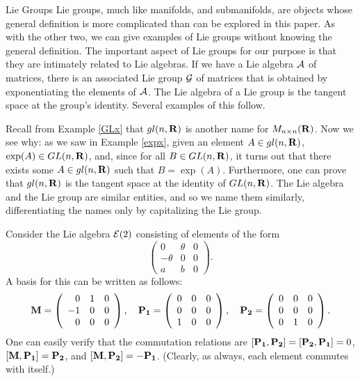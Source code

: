 \begin{section}{Lie Groups}
Lie groups, much like manifolds, and submanifolds, are objects whose general definition is more complicated than can be explored in this paper.  As with the other two, we can give examples of Lie groups without knowing the general definition.  The important aspect of Lie groups for our purpose is that they are intimately related to Lie algebras.  If we have a Lie algebra $\mathcal{A}$ of matrices, there is an associated Lie group $\mathcal{G}$ of matrices that is obtained by exponentiating the elements of $\mathcal{A}$.  The Lie algebra of a Lie group is the tangent space at the group's identity.  Several examples of this follow.

Recall from Example \ref{GLx} that $gl(n,\mathbf{R})$ is another name for $M_{n \times n}(\mathbf{R})$.  Now we see why: as we saw in Example \ref{expx}, given an element $A \in gl(n, \mathbf{R})$, $\exp(A) \in GL(n, \mathbf{R})$, and, since for all $B \in GL(n, \mathbf{R})$, it turns out that there exists some $A \in gl(n,\mathbf{R})$ such that $B = \exp(A)$.  Furthermore, one can prove that $gl(n,\mathbf{R})$ is the tangent space at the identity of $GL(n,\mathbf{R})$.  The Lie algebra and the Lie group are similar entities, and so we name them similarly, differentiating the names only by capitalizing the Lie group.

Consider the Lie algebra $\mathcal{E}(2)$ consisting of elements of the form
\[
\left(	\begin{array}{rrr}
		0		&\theta		& 0	\\
		-\theta		& 0		& 0	\\
		a		& b		& 0
\end{array} \right).
\]
A basis for this can be written as follows:
\[
\mathbf{M} = \left( \begin{array}{rrr}
		0 		& 1		& 0	\\
		-1		& 0		& 0	\\
		0		& 0		& 0
\end{array} \right), \quad
\mathbf{P_1} = \left( \begin{array}{rrr}
		0 		& 0		& 0	\\
		0		& 0		& 0	\\
		1		& 0		& 0
\end{array} \right), \quad
\mathbf{P_2} = \left( \begin{array}{rrr}
		0 		& 0		& 0	\\
		0		& 0		& 0	\\
		0		& 1		& 0
\end{array} \right).
\]
One can easily verify that the commutation relations are $[\mathbf{P_1},\mathbf{P_2}] = [\mathbf{P_2},\mathbf{P_1}] = 0$, $[\mathbf{M},\mathbf{P_1}] = \mathbf{P_2}$, and $[\mathbf{M},\mathbf{P_2}] = -\mathbf{P_1}$.  (Clearly, as always, each element commutes with itself.)


\end{section}
